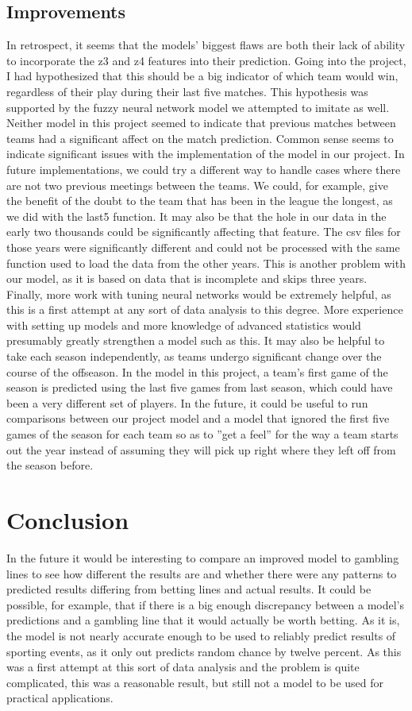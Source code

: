 \documentclass{article}
\begin{document}
\subsection{Improvements}
In retrospect, it seems that the models' biggest flaws are both their lack of ability to incorporate the z3 and z4 features into their prediction. Going into the project, I had hypothesized that this should be a big indicator of which team would win, regardless of their play during their last five matches. This hypothesis was supported by the fuzzy neural network model we attempted to imitate as well. Neither model in this project seemed to indicate that previous matches between teams had a significant affect on the match prediction. Common sense seems to indicate significant issues with the implementation of the model in our project. In future implementations, we could try a different way to handle cases where there are not two previous meetings between the teams. We could, for example, give the benefit of the doubt to the team that has been in the league the longest, as we did with the last5 function. It may also be that the hole in our data in the early two thousands could be significantly affecting that feature. The csv files for those years were significantly different and could not be processed with the same function used to load the data from the other years. This is another problem with our model, as it is based on data that is incomplete and skips three years. Finally, more work with tuning neural networks would be extremely helpful, as this is a first attempt at any sort of data analysis to this degree. More experience with setting up models and more knowledge of advanced statistics would presumably greatly strengthen a model such as this. It may also be helpful to take each season independently, as teams undergo significant change over the course of the offseason. In the model in this project, a team's first game of the season is predicted using the last five games from last season, which could have been a very different set of players. In the future, it could be useful to run comparisons between our project model and a model that ignored the first five games of the season for each team so as to ''get a feel'' for the way a team starts out the year instead of assuming they will pick up right where they left off from the season before.

\section{Conclusion}
In the future it would be interesting to compare an improved model to gambling lines to see how different the results are and whether there were any patterns to predicted results differing from betting lines and actual results. It could be possible, for example, that if there is a big enough discrepancy between a model's predictions and a gambling line that it would actually be worth betting. As it is, the model is not nearly accurate enough to be used to reliably predict results of sporting events, as it only out predicts random chance by twelve percent. As this was a first attempt at this sort of data analysis and the problem is quite complicated, this was a reasonable result, but still not a model to be used for practical applications.
\end{document}
